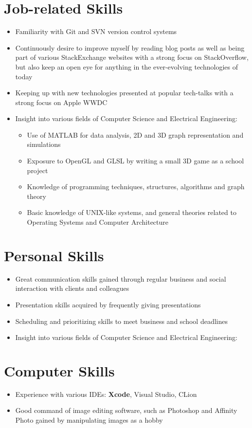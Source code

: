 \documentclass[11pt, a4paper, sans]{moderncv}
\begin{document}
\section{Job-related Skills}
\begin{itemize}
\item Familiarity with Git and SVN version control systems
\item Continuously desire to improve myself by reading blog posts as well as being part of various StackExchange websites with a strong focus on StackOverflow, but also keep an open eye for anything in the ever-evolving technologies of today
\item Keeping up with new technologies presented at popular tech-talks with a strong focus on Apple WWDC
\item Insight into various fields of Computer Science and Electrical Engineering:
{\begin{itemize}
	\item Use of MATLAB for data analysis, 2D and 3D graph representation and simulations
	\item Exposure to OpenGL and GLSL by writing a small 3D game as a school project
	\item Knowledge of programming techniques, structures, algorithms and graph theory
	\item Basic knowledge of UNIX-like systems, and general theories related to Operating Systems and Computer Architecture
\end{itemize}}
\end{itemize}

\section{Personal Skills}
\begin{itemize}
	\item Great communication skills gained through regular business and social interaction with clients and colleagues
	\item Presentation skills acquired by frequently giving presentations
	\item Scheduling and prioritizing skills to meet business and school deadlines
	\item Insight into various fields of Computer Science and Electrical Engineering:
\end{itemize}

\section{Computer Skills}
\begin{itemize}
	\item Experience with various IDEs: \textbf{Xcode}, Visual Studio, CLion 
	\item Good command of image editing software, such as Photoshop and Affinity Photo gained by manipulating images as a hobby
\end{itemize}
\end{document}
